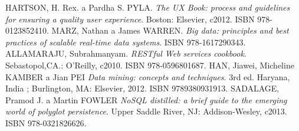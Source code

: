 \begin{thebibliography}{99}
HARTSON, H. Rex. a Pardha S. PYLA.
\textit{The UX Book: process and guidelines for ensuring a quality user experience}. 
Boston: Elsevier, c2012. ISBN 978-0123852410.
MARZ, Nathan a James WARREN.
\textit{Big data: principles and best practices of scalable real-time data systems}. 
ISBN 978-1617290343.
ALLAMARAJU, Subrahmanyam.
\textit{RESTful Web services cookbook}.
Sebastopol,CA.: O'Reilly, c2010. ISBN 978-0596801687.
HAN, Jiawei, Micheline KAMBER a Jian PEI
\textit{Data mining: concepts and techniques}.
3rd ed. Haryana, India ; Burlington, MA: Elsevier, 2012. ISBN 9789380931913.
SADALAGE, Pramod J. a Martin FOWLER
\textit{NoSQL distilled: a brief guide to the emerging world of polyglot persistence}.
Upper Saddle River, NJ: Addison-Wesley, c2013. ISBN 978-0321826626.

\end{thebibliography}
